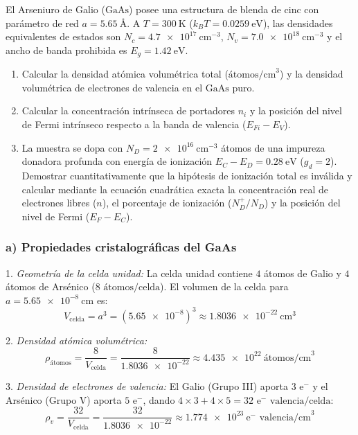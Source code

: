 \newpage
\begin{problema}
El Arseniuro de Galio ($\text{GaAs}$) posee una estructura de blenda de cinc con parámetro de red $a = \SI{5.65}{\text{\AA}}$. A $T = \SI{300}{\kelvin}$ ($k_B T = \SI{0.0259}{\eV}$), las densidades equivalentes de estados son $N_c = \SI{4.7e17}{\cm^{-3}}$, $N_v = \SI{7.0e18}{\cm^{-3}}$ y el ancho de banda prohibida es $E_g = \SI{1.42}{\eV}$.

\begin{enumerate}[label=\alph*)]
    \item Calcular la densidad atómica volumétrica total ($\text{átomos/cm}^3$) y la densidad volumétrica de electrones de valencia en el $\text{GaAs}$ puro.
    \item Calcular la concentración intrínseca de portadores $n_i$ y la posición del nivel de Fermi intrínseco respecto a la banda de valencia ($E_{Fi} - E_V$).
    \item La muestra se dopa con $N_D = \SI{2e16}{\cm^{-3}}$ átomos de una impureza donadora profunda con energía de ionización $E_C - E_D = \SI{0.28}{\eV}$ ($g_d = 2$). Demostrar cuantitativamente que la hipótesis de ionización total es inválida y calcular mediante la ecuación cuadrática exacta la concentración real de electrones libres ($n$), el porcentaje de ionización ($N_D^+ / N_D$) y la posición del nivel de Fermi ($E_F - E_C$).
\end{enumerate}

\tcblower

\subsubsection*{a) Propiedades cristalográficas del GaAs}

1. \textit{Geometría de la celda unidad:}
La celda unidad contiene $4$ átomos de Galio y $4$ átomos de Arsénico ($8\text{ átomos/celda}$).
El volumen de la celda para $a = \SI{5.65e-8}{\cm}$ es:
\[
V_{\text{celda}} = a^3 = (\num{5.65e-8})^3 \approx \SI{1.8036e-22}{\cm^3}
\]

2. \textit{Densidad atómica volumétrica:}
\[
\rho_{\text{átomos}} = \frac{8}{V_{\text{celda}}} = \frac{8}{\num{1.8036e-22}} \approx \SI{4.435e22}{\text{átomos/cm}^3}
\]

3. \textit{Densidad de electrones de valencia:}
El Galio (Grupo III) aporta $3\text{ e}^-$ y el Arsénico (Grupo V) aporta $5\text{ e}^-$, dando $4 \times 3 + 4 \times 5 = 32\text{ e}^-\text{ valencia/celda}$:
\[
\rho_v = \frac{32}{V_{\text{celda}}} = \frac{32}{\num{1.8036e-22}} \approx \SI{1.774e23}{\text{e}^-\text{ valencia/cm}^3}
\]


\end{problema}
